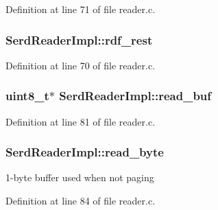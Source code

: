 Definition at line 71 of file reader.\+c.

\subsubsection[{\texorpdfstring{rdf\+\_\+rest}{rdf_rest}}]{ Serd\+Reader\+Impl\+::rdf\+\_\+rest}\hypertarget{struct_serd_reader_impl_a32af449a191e755cb1127c3508f2b430}{}\label{struct_serd_reader_impl_a32af449a191e755cb1127c3508f2b430}


Definition at line 70 of file reader.\+c.

\subsubsection[{\texorpdfstring{read\+\_\+buf}{read_buf}}]{ {\bf uint8\+\_\+t}$\ast$ Serd\+Reader\+Impl\+::read\+\_\+buf}\hypertarget{struct_serd_reader_impl_ac46a2d2d335e8f045c6d830359222055}{}\label{struct_serd_reader_impl_ac46a2d2d335e8f045c6d830359222055}


Definition at line 81 of file reader.\+c.

\subsubsection[{\texorpdfstring{read\+\_\+byte}{read_byte}}]{ Serd\+Reader\+Impl\+::read\+\_\+byte}\hypertarget{struct_serd_reader_impl_ad1ca00cbb0da8030ee0213e281bc049b}{}\label{struct_serd_reader_impl_ad1ca00cbb0da8030ee0213e281bc049b}


1-\/byte \textquotesingle{}buffer\textquotesingle{} used when not paging 



Definition at line 84 of file reader.\+c.

